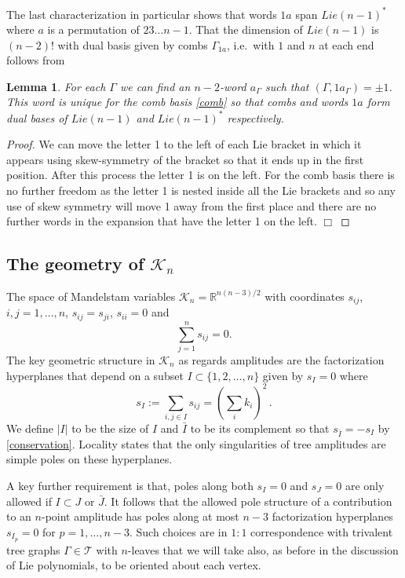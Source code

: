 \documentclass[11pt]{article}
\newcommand{\R}{\mathbb{R}}
\newcommand{\cK}{\mathcal{K}}
\newcommand{\cT}{\mathcal{T}}
\newcommand{\1}{{\rm 1\hskip-0.25em I}}
\newtheorem{lemma}{Lemma}[section]
\begin{document}
  The last characterization in particular shows that  words $1a$ span $Lie(n-1)^*$ where $a$ is a permutation of $23\ldots n-1$. That the dimension of  $Lie(n-1)$ is $(n-2)!$ with  dual basis given by combs $\Gamma_{1a}$, i.e.\ with $1$ and $n$ at each end follows from
  
  \begin{lemma}
For each $\Gamma$ we can find an $n-2$-word $a_\Gamma$ such that $(\Gamma,1a_{\Gamma})=\pm 1$.  This word is unique for the comb basis \eqref{comb} so that combs and words $1a$ form dual bases of $Lie(n-1)$ and $Lie(n-1)^*$ respectively.
\end{lemma}
\begin{proof}
We can move the letter 1 to the left of each Lie bracket in which it appears using skew-symmetry of the bracket so that it ends up in the first position.  After this process the letter 1 is on the left.  For the comb  basis there is no further freedom as the letter 1 is nested inside all the Lie brackets and so any use of skew symmetry will move 1 away from the first place and there are no further words in the expansion that have the letter 1 on the left. $\Box$
\end{proof}


\subsection{The geometry of $\cK_n$}

The space of Mandelstam variables $\cK_n=\R^{n(n-3)/2}$ with coordinates $s_{ij}$, $i,j=1,\ldots , n$, $s_{ij}=s_{ji}$, $s_{ii}=0$ and 
\begin{equation}
\sum_{j=1}^n s_{ij} = 0. \label{conservation}
\end{equation}
The key geometric structure in $\cK_n$ as regards amplitudes are the factorization hyperplanes that depend on a subset $I\subset \{1,2,\ldots,n\}$ given by $s_I=0$ where\begin{equation}
s_I:=\sum_{i,j\in I} s_{ij}=\left(\sum_i k_i\right)^2\, .
\end{equation}
We define $|I|$ to be the size of $I$ and $\bar I$ to be its complement so that $s_{\bar I}=-s_I$ by \eqref{conservation}. Locality states that the only singularities of tree amplitudes are simple poles on these hyperplanes. 

A key further requirement is that, poles along both $s_I=0$ and $s_J=0$ are only allowed if $I\subset J$ or $\bar J$.
It follows that the allowed pole structure of a contribution to an $n$-point amplitude has poles along at most $n-3$ factorization hyperplanes $s_{I_p}=0$ for $p=1,\ldots ,n-3$.  Such choices are in $1:1$ correspondence with trivalent tree graphs $\Gamma\in \cT$  with $n$-leaves that we will take also, as before in the discussion of Lie polynomials, to be oriented about each vertex. 
\end{document}
